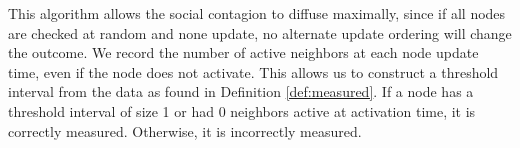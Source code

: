 \documentclass[a4paper]{article}
\begin{document}
\noindent
This algorithm allows the social contagion to diffuse maximally, since if all nodes are checked at random and none update, no alternate update ordering will change the outcome. We record the number of active neighbors at each node update time, even if the node does not activate. This allows us to construct a threshold interval from the data as found in Definition \ref{def:measured}. If a node has a threshold interval of size 1 or had 0 neighbors active at activation time, it is correctly measured. Otherwise, it is incorrectly measured.


\printbibliography
\end{document}
